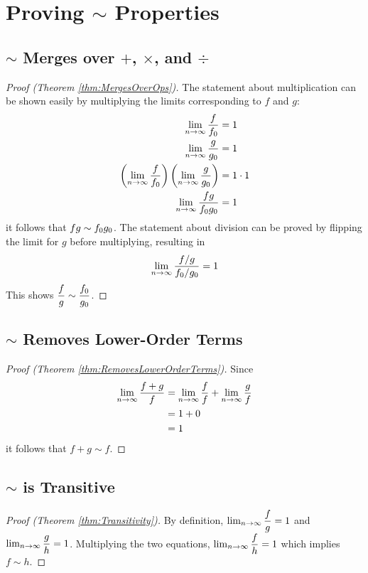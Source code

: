 \appendix
\appendixpage

\section{Proving $\sim$ Properties}

\subsection{$\sim$ Merges over $+$, $\times$, and $\div$}
\label{pf:MergesOverArithmetic}
\begin{proof}[Proof (Theorem \ref{thm:MergesOverOps})]
	
	The statement about multiplication can be shown easily by multiplying the limits corresponding to $f$ and $g$:
	\begin{align*}
	\lim_{n \to \infty} \frac{f}{f_0} &= 1\\
	\lim_{n \to \infty} \frac{g}{g_0} &= 1\\
	\left( \lim_{n \to \infty} \frac{f}{f_0} \right) \left( \lim_{n \to \infty} \frac{g}{g_0} \right) &= 1 \cdot 1\\
	\lim_{n \to \infty} \frac{fg}{f_0g_0} &= 1
	\end{align*}
	it follows that $fg \sim f_0g_0$. The statement about division can be proved by flipping the limit for $g$ before multiplying, resulting in
	\begin{align*}
	\lim_{n \to \infty} \frac{f / g}{f_0 / g_0} = 1
	\end{align*}
	This shows $\dfrac f g \sim \dfrac {f_0} {g_0}$.
\end{proof}

\subsection{$\sim$ Removes Lower-Order Terms}
\label{pf:RemovesLowerOrderTerms}

\begin{proof}[Proof (Theorem \ref{thm:RemovesLowerOrderTerms})]
	Since
	\begin{align*}
	\lim_{n \to \infty} \frac{f + g}{f} &= \lim_{n \to \infty} \frac{f}{f} + \lim_{n \to \infty} \frac{g}{f}\\
	&= 1 + 0\\
	&= 1
	\end{align*}
	it follows that $f + g \sim f$.
\end{proof}

\subsection{$\sim$ is Transitive}
\label{pf:Transitivity}

\begin{proof}[Proof (Theorem \ref{thm:Transitivity})]
By definition, $\lim_{n \to \infty} \dfrac f g = 1$ and $\lim_{n \to \infty} \dfrac g h = 1$. Multiplying the two equations, $\lim_{n \to \infty} \dfrac f h = 1$ which implies $f \sim h$.
\end{proof}